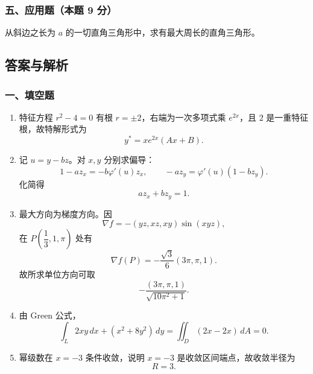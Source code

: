 \subsubsection*{五、应用题（本题 9 分）}
从斜边之长为 $a$ 的一切直角三角形中，求有最大周长的直角三角形。

\subsection{答案与解析}

\subsubsection*{一、填空题}
\begin{enumerate}
  \item 特征方程 $r^2-4=0$ 有根 $r=\pm2$，右端为一次多项式乘 $e^{2x}$，且 $2$ 是一重特征根，故特解形式为
  \[
  y^*=xe^{2x}(Ax+B).
  \]
  \item 记 $u=y-bz$。对 $x,y$ 分别求偏导：
  \[
  1-az_x=-b\varphi'(u)z_x,\qquad -az_y=\varphi'(u)(1-bz_y).
  \]
  化简得
  \[
  a z_x+b z_y=1.
  \]
  \item 最大方向为梯度方向。因
  \[
  \nabla f=-(yz,xz,xy)\sin(xyz),
  \]
  在 $P\!\left(\dfrac13,1,\pi\right)$ 处有
  \[
  \nabla f(P)=-\frac{\sqrt3}{6}(3\pi,\pi,1).
  \]
  故所求单位方向可取
  \[
  -\frac{(3\pi,\pi,1)}{\sqrt{10\pi^2+1}}.
  \]
  \item 由 Green 公式，
  \[
  \int_L 2xy\,dx+(x^2+8y^2)\,dy
  =\iint_D(2x-2x)\,dA=0.
  \]
  \item 幂级数在 $x=-3$ 条件收敛，说明 $x=-3$ 是收敛区间端点，故收敛半径为
  \[
  R=3.
  \]
\end{enumerate}

